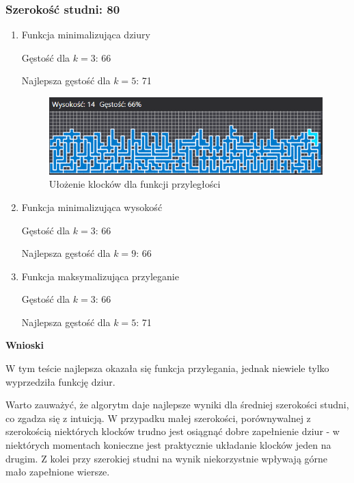 \documentclass{article}
\begin{document}
\subsubsection{Szerokość studni: 80}
\begin{enumerate}

\item Funkcja minimalizująca dziury

Gęstość dla $k=3$: 66

Najlepsza gęstość dla $k=5$: 71

\begin{figure}[H]
\includegraphics[width=\textwidth]{szeroka_plansza.PNG}
\caption{Ułożenie klocków dla funkcji przyległości}
\end{figure}

\item Funkcja minimalizująca wysokość

Gęstość dla $k=3$: 66

Najlepsza gęstość dla $k=9$: 66

\item Funkcja maksymalizująca przyleganie

Gęstość dla $k=3$: 66

Najlepsza gęstość dla $k=5$: 71

\end{enumerate}
\textbf{Wnioski}

W tym teście najlepsza okazała się funkcja przylegania, jednak niewiele tylko wyprzedziła funkcję dziur.

Warto zauważyć, że algorytm daje najlepsze wyniki dla średniej szerokości studni, co zgadza się z intuicją.
W przypadku małej szerokości, porównywalnej z szerokością niektórych klocków trudno jest osiągnąć dobre zapełnienie dziur - w niektórych momentach konieczne jest praktycznie układanie klocków jeden na drugim.
Z kolei przy szerokiej studni na wynik niekorzystnie wpływają górne mało zapełnione wiersze.
\clearpage
\end{document}
